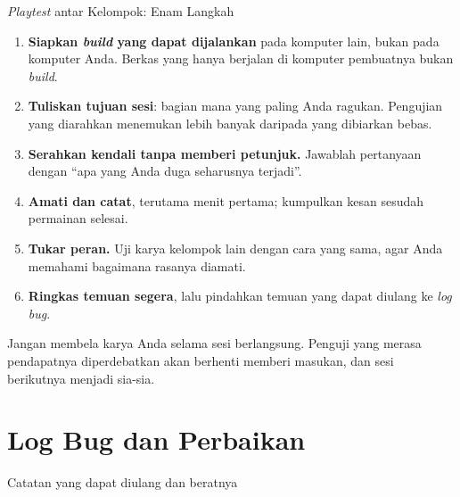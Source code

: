 \documentclass[aspectratio=169,10pt]{beamer}
\begin{document}
\begin{frame}{\emph{Playtest} antar Kelompok: Enam Langkah}
\begin{enumerate}
  \item \textbf{Siapkan \emph{build} yang dapat dijalankan} pada komputer lain,
        bukan pada komputer Anda. Berkas yang hanya berjalan di komputer
        pembuatnya bukan \emph{build}.
  \item \textbf{Tuliskan tujuan sesi}: bagian mana yang paling Anda ragukan.
        Pengujian yang diarahkan menemukan lebih banyak daripada yang
        dibiarkan bebas.
  \item \textbf{Serahkan kendali tanpa memberi petunjuk.} Jawablah pertanyaan
        dengan ``apa yang Anda duga seharusnya terjadi''.
  \item \textbf{Amati dan catat}, terutama menit pertama; kumpulkan kesan
        sesudah permainan selesai.
  \item \textbf{Tukar peran.} Uji karya kelompok lain dengan cara yang sama,
        agar Anda memahami bagaimana rasanya diamati.
  \item \textbf{Ringkas temuan segera}, lalu pindahkan temuan yang dapat diulang
        ke \emph{log bug}.
\end{enumerate}
\begin{peringatan}
Jangan membela karya Anda selama sesi berlangsung. Penguji yang merasa
pendapatnya diperdebatkan akan berhenti memberi masukan, dan sesi berikutnya
menjadi sia-sia.
\end{peringatan}
\end{frame}

\section{Log Bug dan Perbaikan}
  {Catatan yang dapat diulang dan beratnya}
\end{document}
